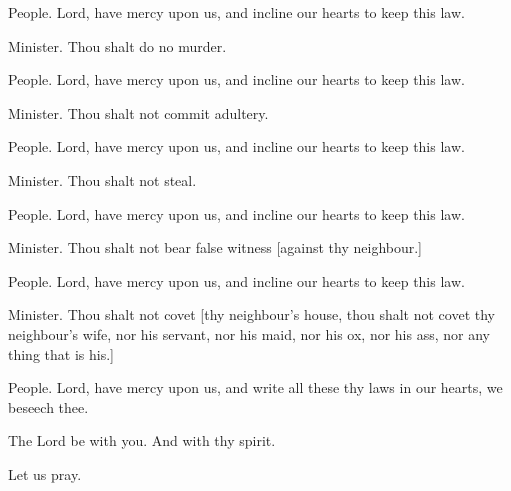 People. Lord, have mercy upon us, and incline our hearts to keep this law.

Minister. Thou shalt do no murder.

People. Lord, have mercy upon us, and incline our hearts to keep this law.

Minister. Thou shalt not commit adultery.
    
People. Lord, have mercy upon us, and incline our hearts to keep this law.

Minister. Thou shalt not steal.

People. Lord, have mercy upon us, and incline our hearts to keep this law.

Minister. Thou shalt not bear false witness [against thy neighbour.]

People. Lord, have mercy upon us, and incline our hearts to keep this law.

Minister. Thou shalt not covet [thy neighbour's house, thou shalt not covet thy neighbour's wife, nor his servant, nor his maid, nor his ox, nor his ass, nor any thing that is his.]

People. Lord, have mercy upon us, and write all these thy laws in our hearts, we beseech thee.

\V The Lord be with you. \R And with thy spirit.

\centerline{Let us pray.}



